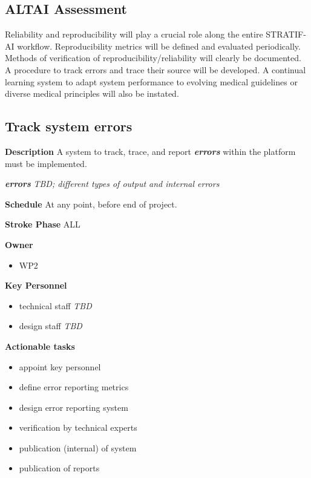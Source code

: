 \documentclass[
  letterpaper,
  DIV=11,
  numbers=noendperiod]{scrreport}
\providecommand{\tightlist}{%
  \setlength{\itemsep}{0pt}\setlength{\parskip}{0pt}}\usepackage{longtable,booktabs,array}
\begin{document}
\hypertarget{altai-assessment-5}{%
\subsection*{ALTAI Assessment}\label{altai-assessment-5}}

Reliability and reproducibility will play a crucial role along the
entire STRATIF-AI workflow. Reproducibility metrics will be defined and
evaluated periodically. Methods of verification of
reproducibility/reliability will clearly be documented. A procedure to
track errors and trace their source will be developed. A continual
learning system to adapt system performance to evolving medical
guidelines or diverse medical principles will also be instated.

\hypertarget{track-system-errors}{%
\subsection{Track system errors}\label{track-system-errors}}

\textbf{Description} A system to track, trace, and report
\textbf{\emph{errors}} within the platform must be implemented.

\textbf{\emph{errors}} \emph{TBD; different types of output and internal
errors}

\textbf{Schedule} At any point, before end of project.

\textbf{Stroke Phase} ALL

\textbf{Owner}

\begin{itemize}
\tightlist
\item
  WP2
\end{itemize}

\textbf{Key Personnel}

\begin{itemize}
\tightlist
\item
  technical staff \emph{TBD}
\item
  design staff \emph{TBD}
\end{itemize}

\textbf{Actionable tasks}

\begin{itemize}
\tightlist
\item
  appoint key personnel
\item
  define error reporting metrics
\item
  design error reporting system
\item
  verification by technical experts
\item
  publication (internal) of system
\item
  publication of reports
\end{itemize}
\end{document}
